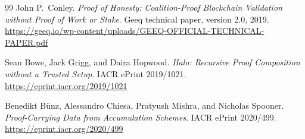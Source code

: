 \documentclass[11pt]{article}
\begin{document}
\begin{thebibliography}{99}
John P.~Conley.
\newblock \emph{Proof of Honesty: Coalition-Proof Blockchain Validation without
Proof of Work or Stake}.
\newblock Geeq technical paper, version 2.0, 2019.
\newblock \url{https://geeq.io/wp-content/uploads/GEEQ-OFFICIAL-TECHNICAL-PAPER.pdf}

Sean Bowe, Jack Grigg, and Daira Hopwood.
\newblock \emph{Halo: Recursive Proof Composition without a Trusted Setup}.
\newblock IACR ePrint 2019/1021.
\newblock \url{https://eprint.iacr.org/2019/1021}

Benedikt B{\"u}nz, Alessandro Chiesa, Pratyush Mishra, and Nicholas Spooner.
\newblock \emph{Proof-Carrying Data from Accumulation Schemes}.
\newblock IACR ePrint 2020/499.
\newblock \url{https://eprint.iacr.org/2020/499}

\end{thebibliography}
\end{document}
